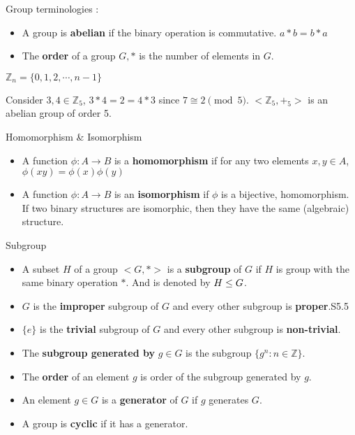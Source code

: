 \begin{definition}Group terminologies :
	\begin{itemize}
		\item A group is \textbf{abelian} if the binary operation is commutative. $a \ast b = b \ast a$%
		\item The \textbf{order} of a group $G,\ast$ is the number of elements in $G$.%
	\end{itemize}
\end{definition}

\begin{definition}
	$\mathbb{Z}_n = \{ 0, 1, 2, \cdots, n-1 \}$
\end{definition}

\begin{remark}
	Consider $3,4 \in \mathbb{Z}_5$,
	$3 \ast 4 = 2 = 4 \ast 3$ since $7 \cong 2 \pmod 5$.
	$<\!\mathbb{Z}_5,+_5\!>$ is an abelian group of order 5.
\end{remark}

\begin{definition} Homomorphism \& Isomorphism
	\begin{itemize}
		\item A function $\phi : A \to B$ is a \textbf{homomorphism} if for any two elements $x,y \in A$, $\phi (xy) = \phi(x)\phi(y)$%
		\item A function $\phi : A \to B$ is an \textbf{isomorphism} if $\phi$ is a bijective, homomorphism.
			If two binary structures  are isomorphic, then they have the same (algebraic) structure.%
	\end{itemize}
\end{definition}

\begin{definition} Subgroup
	\begin{itemize}
		\item A subset $H$ of a group $<\! G,\ast\! >$ is a \textbf{subgroup} of $G$ if $H$ is group with the same binary operation $\ast$.
			And is denoted by $H \le G$.%
		\item $G$ is the \textbf{improper} subgroup of $G$ and every other subgroup is \textbf{proper}.S5.5
		\item $\{e\}$ is the \textbf{trivial} subgroup of $G$ and every other subgroup is \textbf{non-trivial}.%
		\item The \textbf{subgroup generated by} $g \in G$ is the subgroup $\{ g^n : n \in \mathbb{Z} \}$.%
		\item The \textbf{order} of an element $g$ is order of the subgroup generated by $g$.%
		\item An element $g \in G$ is a \textbf{generator} of $G$ if $g$ generates $G$.%
		\item A group is \textbf{cyclic} if it has a generator.%
	\end{itemize}
\end{definition}

